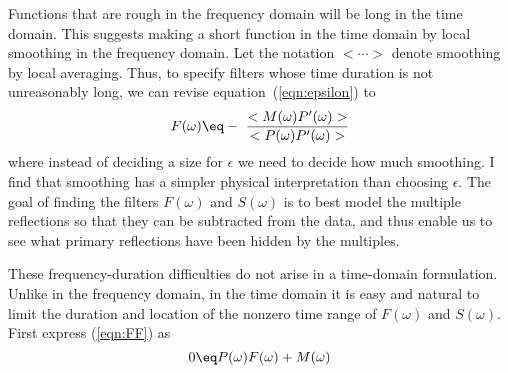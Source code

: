 \par
Functions that are rough in the frequency domain will be long in
the time domain. 
This suggests making a short function in the time domain
by local smoothing in the frequency domain.
Let the notation $< \cdots >$ denote smoothing by local averaging.
Thus,
to specify filters whose time duration is not unreasonably long,
we can revise equation~(\ref{eqn:epsilon}) to
\begin{equation}
F(\omega )\eq
- \ {<M(\omega ) P'(\omega )> \over <P(\omega )P'(\omega )  >}
\label{eqn:smoothit}
\end{equation}
where
instead of deciding a size for $\epsilon$ we need to decide how much smoothing.
I find that smoothing has a simpler physical interpretation than choosing 
$\epsilon$.
The goal of finding the filters $F(\omega )$ and $S(\omega )$ is to
best model the multiple reflections so that they can
be subtracted from the data,
and thus enable us to see what primary reflections
have been hidden by the multiples.

\par
These frequency-duration difficulties do not arise in a time-domain formulation.
Unlike in the frequency domain,
in the time domain it is easy and natural
to limit the duration and location
of the nonzero time range of $F(\omega)$ and $S(\omega)$.
First express
(\ref{eqn:FF}) as
\begin{equation}
0 \eq P(\omega )F(\omega ) +M(\omega )  
\label{eqn:floor}
\end{equation}

